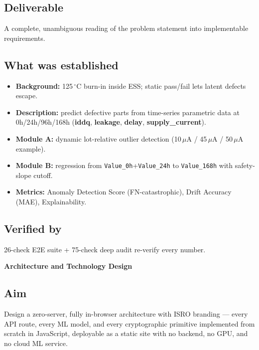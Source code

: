 \documentclass[11pt,a4paper]{article}
\newcommand{\code}[1]{\texttt{\small #1}}
\newcommand{\keys}[1]{\textbf{\sffamily#1}}
\newcommand{\phasebox}[3]{\par\vspace{1em}\noindent
  \begin{tcolorbox}[colback=isroblue!6,colframe=isroblue,
    title={\sffamily\bfseries\color{white}#1 \quad [Progress: #2]},arc=2pt,boxrule=1.2pt]
    \textbf{#3}
  \end{tcolorbox}\par\vspace{0.4em}}
\begin{document}
\subsection*{Deliverable}
A complete, unambiguous reading of the problem statement into implementable requirements.

\subsection*{What was established}
\begin{itemize}[leftmargin=1.5em]
  \item \textbf{Background:} 125\,$^{\circ}$C burn-in inside ESS; static pass/fail lets latent
        defects escape.
  \item \textbf{Description:} predict defective parts from time-series parametric data at
        0h/24h/96h/168h (\keys{iddq}, \keys{leakage}, \keys{delay}, \keys{supply\_current}).
  \item \textbf{Module A:} dynamic lot-relative outlier detection (10\,$\mu$A / 45\,$\mu$A /
        50\,$\mu$A example).
  \item \textbf{Module B:} regression from \code{Value\_0h}+\code{Value\_24h} to
        \code{Value\_168h} with safety-slope cutoff.
  \item \textbf{Metrics:} Anomaly Detection Score (FN-catastrophic), Drift Accuracy (MAE),
        Explainability.
\end{itemize}

\subsection*{Verified by}
26-check E2E suite + 75-check deep audit re-verify every number.

\phasebox{Phase 2}{15\% -- 35\%}{Architecture and Technology Design}

\subsection*{Aim}
Design a zero-server, fully in-browser architecture with ISRO branding --- every API route,
every ML model, and every cryptographic primitive implemented from scratch in JavaScript, deployable
as a static site with no backend, no GPU, and no cloud ML service.
\end{document}

